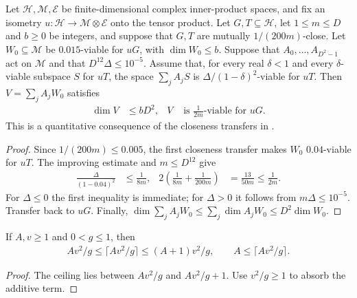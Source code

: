 \begin{theorem}
    \label{thm:viable_enlargement_inverse_scale}
    \leanok
    Let $\mathcal H,\mathcal M,\mathcal E$ be finite-dimensional complex
    inner-product spaces, and fix an isometry
    $u:\mathcal H\to\mathcal M\otimes\mathcal E$ onto the tensor product.
    Let $G,T\subseteq\mathcal H$, let $1\le m\le D$ and $b\ge0$ be integers,
    and suppose that $G,T$ are mutually $1/(200m)$-close.
    Let $W_0\subseteq\mathcal M$ be $0.015$-viable for $uG$, with $\dim W_0\le b$.
    Suppose that $A_0,\ldots,A_{D^2-1}$ act on $\mathcal M$ and that
    $D^{12}\Delta\le10^{-5}$. Assume that, for every real $\delta<1$ and
    every $\delta$-viable subspace $S$ for $uT$, the space
    $\sum_j A_jS$ is $\Delta/(1-\delta)^2$-viable for $uT$.
    Then $V=\sum_j A_jW_0$ satisfies
    \begin{align}
        \dim V&\le bD^2, & V&\text{ is }\frac1{2m}\text{-viable for }uG.
        \label{eq:viable_inverse_scale}
    \end{align}
    This is a quantitative consequence of the closeness transfers in
    \cite[Lemma~l:close and proof of Theorem~4.9]{Arad2016RigorousRG}.
\end{theorem}
\begin{proof}
    \leanok
    Since $1/(200m)\le0.005$, the first closeness transfer makes $W_0$
    $0.04$-viable for $uT$. The improving estimate and $m\le D^{12}$ give
    \begin{align*}
        \frac{\Delta}{(1-0.04)^2}&\le\frac1{8m}, &
        2\left(\frac1{8m}+\frac1{200m}\right)&=\frac{13}{50m}\le\frac1{2m}.
    \end{align*}
    For $\Delta\le0$ the first inequality is immediate; for $\Delta>0$
    it follows from $m\Delta\le10^{-5}$.
    Transfer back to $uG$. Finally,
    $\dim\sum_j A_jW_0\le\sum_j\dim A_jW_0\le D^2\dim W_0$.
\end{proof}

\begin{lemma}
    \label{lem:ceil_quadratic_scale}
    \leanok
    If $A,v\ge1$ and $0<g\le1$, then
    \begin{align*}
      Av^2/g\le\lceil Av^2/g\rceil
      \le(A+1)v^2/g,
      \qquad A\le\lceil Av^2/g\rceil.
    \end{align*}
\end{lemma}
\begin{proof}
    \leanok
    The ceiling lies between $Av^2/g$ and $Av^2/g+1$.
    Use $v^2/g\ge1$ to absorb the additive term.
\end{proof}

